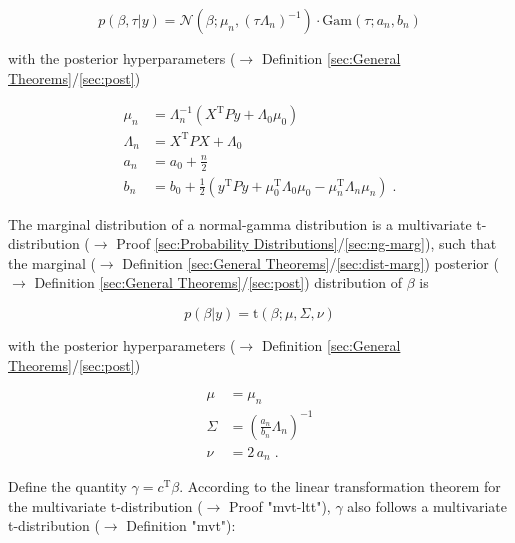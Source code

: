 \documentclass[a4paper,12pt,twoside]{book}
\begin{document}
\begin{equation} \label{eq:blr-pp-GLM-NG-post}
p(\beta,\tau|y) = \mathcal{N}(\beta; \mu_n, (\tau \Lambda_n)^{-1}) \cdot \mathrm{Gam}(\tau; a_n, b_n)
\end{equation}

with the posterior hyperparameters ($\rightarrow$ Definition \ref{sec:General Theorems}/\ref{sec:post})

\begin{equation} \label{eq:blr-pp-GLM-NG-post-par}
\begin{split}
\mu_n &= \Lambda_n^{-1} (X^\mathrm{T} P y + \Lambda_0 \mu_0) \\
\Lambda_n &= X^\mathrm{T} P X + \Lambda_0 \\
a_n &= a_0 + \frac{n}{2} \\
b_n &= b_0 + \frac{1}{2} (y^\mathrm{T} P y + \mu_0^\mathrm{T} \Lambda_0 \mu_0 - \mu_n^\mathrm{T} \Lambda_n \mu_n) \; .
\end{split}
\end{equation}

The marginal distribution of a normal-gamma distribution is a multivariate t-distribution ($\rightarrow$ Proof \ref{sec:Probability Distributions}/\ref{sec:ng-marg}), such that the marginal ($\rightarrow$ Definition \ref{sec:General Theorems}/\ref{sec:dist-marg}) posterior ($\rightarrow$ Definition \ref{sec:General Theorems}/\ref{sec:post}) distribution of $\beta$ is

\begin{equation} \label{eq:blr-pp-GLM-NG-post-beta}
p(\beta|y) = \mathrm{t}(\beta; \mu, \Sigma, \nu)
\end{equation}

with the posterior hyperparameters ($\rightarrow$ Definition \ref{sec:General Theorems}/\ref{sec:post})

\begin{equation} \label{eq:blr-pp-GLM-NG-post-par-beta}
\begin{split}
\mu &= \mu_n \\
\Sigma &= \left( \frac{a_n}{b_n} \Lambda_n \right)^{-1} \\
\nu &= 2 \, a_n \; .
\end{split}
\end{equation}

Define the quantity $\gamma = c^\mathrm{T} \beta$. According to the linear transformation theorem for the multivariate t-distribution ($\rightarrow$ Proof "mvt-ltt"), $\gamma$ also follows a multivariate t-distribution ($\rightarrow$ Definition "mvt"):
\end{document}
